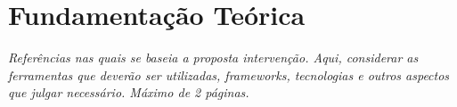 \section{Fundamentação Teórica}

\textit{Referências nas quais se baseia a proposta intervenção. Aqui, considerar as ferramentas que deverão ser utilizadas, frameworks, tecnologias e outros aspectos que julgar necessário. Máximo de 2 páginas.}
